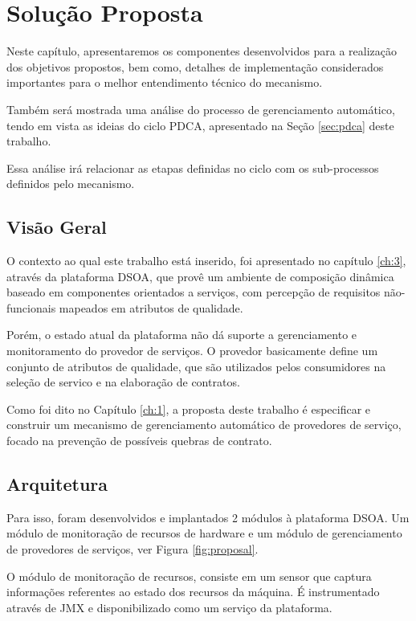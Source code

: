 \chapter{Solução Proposta}
\label{ch:4}

Neste capítulo, apresentaremos os componentes desenvolvidos para a realização dos objetivos propostos, bem como, detalhes de implementação considerados importantes para o melhor entendimento técnico do mecanismo. 

Também será mostrada uma análise do processo de gerenciamento automático, tendo em vista as ideias do ciclo PDCA, apresentado na Seção \ref{sec:pdca} deste trabalho. 

Essa análise irá relacionar as etapas definidas no ciclo com os sub-processos definidos pelo mecanismo.

\section{Visão Geral}
O contexto ao qual este trabalho está inserido, foi apresentado no capítulo \ref{ch:3}, através da plataforma DSOA, que provê um ambiente de composição dinâmica baseado em componentes orientados a serviços, com percepção de requisitos não-funcionais mapeados em atributos de qualidade. 

Porém, o estado atual da plataforma não dá suporte a gerenciamento e monitoramento do provedor de serviços. O provedor basicamente define um conjunto de atributos de qualidade, que são utilizados pelos consumidores na seleção de servico e na elaboração de contratos.


Como foi dito no Capítulo \ref{ch:1}, a proposta deste trabalho é especificar e construir um mecanismo de gerenciamento automático de provedores de serviço, focado na prevenção de possíveis quebras de contrato.

\section{Arquitetura}
\label{sec:arch_prop}


Para isso, foram desenvolvidos e implantados 2 módulos à plataforma DSOA. Um módulo de monitoração de recursos de hardware e um módulo de gerenciamento de provedores de serviços, ver Figura \ref{fig:proposal}.

O módulo de monitoração de recursos, consiste em um sensor que captura informações referentes ao estado dos recursos da máquina. É instrumentado através de JMX e disponibilizado como um serviço da plataforma. 

